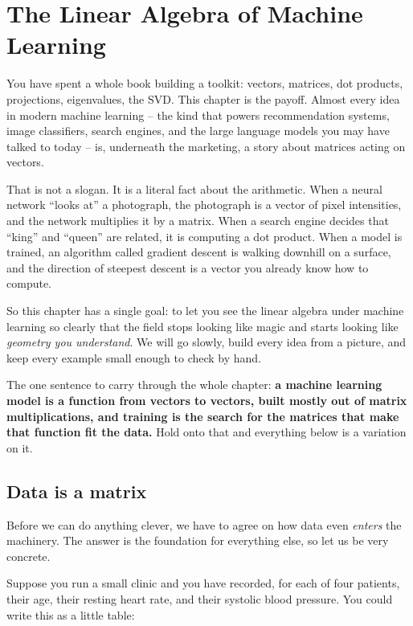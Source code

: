 \chapter{The Linear Algebra of Machine Learning}

You have spent a whole book building a toolkit: vectors, matrices, dot products,
projections, eigenvalues, the SVD. This chapter is the payoff. Almost every idea in
modern machine learning -- the kind that powers recommendation systems, image
classifiers, search engines, and the large language models you may have talked to
today -- is, underneath the marketing, a story about matrices acting on vectors.

That is not a slogan. It is a literal fact about the arithmetic. When a neural network
``looks at'' a photograph, the photograph is a vector of pixel intensities, and the
network multiplies it by a matrix. When a search engine decides that ``king'' and
``queen'' are related, it is computing a dot product. When a model is trained, an
algorithm called gradient descent is walking downhill on a surface, and the direction
of steepest descent is a vector you already know how to compute.

So this chapter has a single goal: to let you see the linear algebra under machine
learning so clearly that the field stops looking like magic and starts looking like
\emph{geometry you understand}. We will go slowly, build every idea from a picture, and
keep every example small enough to check by hand.

\begin{focusbox}
The one sentence to carry through the whole chapter: \textbf{a machine learning model
is a function from vectors to vectors, built mostly out of matrix multiplications, and
training is the search for the matrices that make that function fit the data.} Hold onto
that and everything below is a variation on it.
\end{focusbox}

\section{Data is a matrix}
\label{ch34:data-matrix}

Before we can do anything clever, we have to agree on how data even \emph{enters} the
machinery. The answer is the foundation for everything else, so let us be very concrete.

Suppose you run a small clinic and you have recorded, for each of four patients, their
age, their resting heart rate, and their systolic blood pressure. You could write this
as a little table:


